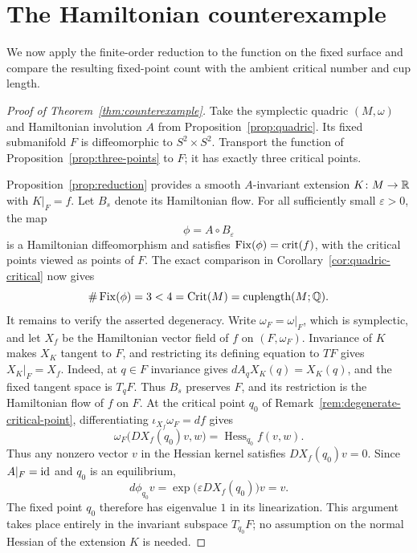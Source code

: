 \section{The Hamiltonian counterexample}
\label{sec:conclusion}

We now apply the finite-order reduction to the function on the fixed
surface and compare the resulting fixed-point count with the ambient
critical number and cup length.

\begin{proof}[Proof of Theorem~\ref{thm:counterexample}]
Take the symplectic quadric $(M,\omega)$ and Hamiltonian involution $A$
from Proposition~\ref{prop:quadric}. Its fixed submanifold $F$ is
diffeomorphic to $S^2\times S^2$.
Transport the function of Proposition~\ref{prop:three-points} to $F$;
it has exactly three critical points.

Proposition~\ref{prop:reduction} provides a smooth $A$-invariant extension
$K\colon M\to\mathbb R$ with $K|_F=f$.
Let $B_s$ denote its Hamiltonian flow. For all sufficiently small
$\varepsilon>0$, the map
\[
  \phi=A\circ B_\varepsilon
\]
is a Hamiltonian diffeomorphism and satisfies
$\operatorname{Fix}(\phi)=\operatorname{crit}(f)$, with the critical points viewed as points of $F$.
The exact comparison in Corollary~\ref{cor:quadric-critical} now gives
\[
  \#\operatorname{Fix}(\phi)=3<4=\operatorname{Crit}(M)
     =\operatorname{cuplength}(M;\mathbb Q).
\]
It remains to verify the asserted degeneracy. Write
$\omega_F=\omega|_F$, which is symplectic,
and let $X_f$ be the Hamiltonian vector field of $f$ on $(F,\omega_F)$.
Invariance of $K$ makes $X_K$ tangent to $F$, and restricting its defining
equation to $TF$ gives $X_K|_F=X_f$. Indeed, at $q\in F$ invariance gives
$dA_qX_K(q)=X_K(q)$, and the fixed tangent space is $T_qF$.
Thus $B_s$ preserves $F$, and its restriction is the Hamiltonian flow
of $f$ on $F$. At the critical point $q_0$ of
Remark~\ref{rem:degenerate-critical-point}, differentiating
$\iota_{X_f}\omega_F=df$ gives
\[
  \omega_F\bigl(DX_f(q_0)v,w\bigr)
  =\operatorname{Hess}_{q_0}f(v,w).
\]
Thus any nonzero vector $v$ in the Hessian kernel satisfies
$DX_f(q_0)v=0$. Since $A|_F=\mathrm{id}$ and $q_0$ is an equilibrium,
\[
  d\phi_{q_0}v
   =\exp\bigl(\varepsilon DX_f(q_0)\bigr)v
   =v.
\]
The fixed point $q_0$ therefore has eigenvalue $1$ in its linearization.
This argument takes place entirely in the invariant subspace $T_{q_0}F$;
no assumption on the normal Hessian of the extension $K$ is needed.
\end{proof}
